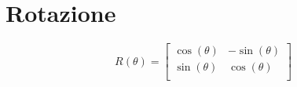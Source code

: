 \documentclass[a4paper,portrait,columns=3,5pt]{cheatsheet}
\begin{document}
\section{Rotazione}
\begin{equation*}
	R(\theta) =
	\begin{bmatrix}
		\cos(\theta) & -\sin(\theta) \\
		\sin(\theta) & \cos(\theta) \\
	\end{bmatrix}
	\end{equation*}
	
\end{document}
